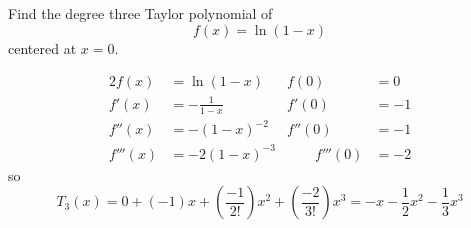 \documentclass[12pt,answers]{exam}
\begin{document}
\begin{questions}
\newpage
\question[9]
Find the degree three Taylor polynomial of
\[
f(x) = \ln(1-x)
\]
centered at $x=0$.
\begin{solution}
\begin{alignat*}{2}
  f(x)    & = \ln(1-x)       & f(0)           & = 0  \\
  f'(x)   & = -\frac{1}{1-x} & f'(0)          & = -1 \\
  f''(x)  & = -(1-x)^{-2}    & f''(0)         & = -1 \\
  f'''(x) & = -2(1-x)^{-3}   & \qquad f'''(0) & = -2
\end{alignat*}
so
\[
T_3(x) = 0 + (-1)x + (\frac{-1}{2!})x^2 + (\frac{-2}{3!})x^3 =
\boxed{-x -\frac12x^2 - \frac13x^3}
\]
\end{solution}
\end{questions}
\end{document}
